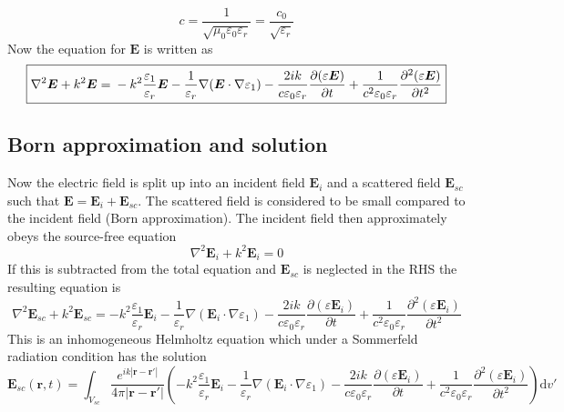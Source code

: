 \documentclass[10pt,a4paper]{eitExjobb}
\begin{document}
	\begin{equation*}
	c = \frac{1}{\sqrt{\mu_0 \varepsilon_0 \varepsilon_r}} = \frac{c_0}{\sqrt{\varepsilon_r}}
	\end{equation*}
	Now the equation for $\bm{E}$ is written as
	\begin{equation*}
	\boxed{
		\nabla^2\bm{E} + k^2 \bm{E} = \\
		-k^2 \frac{\varepsilon_1}{\varepsilon_r} \bm{E} -\frac{1}{\varepsilon_r}\nabla(\bm{E} \cdot \nabla \varepsilon_1) - \frac{2ik}{c\varepsilon_0\varepsilon_r} \frac{\partial (\varepsilon \bm{E})}{\partial t} + \frac{1}{c^2 \varepsilon_0 \varepsilon_r} \frac{\partial^2 (\varepsilon \bm{E})}{\partial t^2}
	}
	\end{equation*}
	
	\subsection{Born approximation and solution}
	Now the electric field is split up into an incident field $\bm{E}_i$ and a scattered field $\bm{E}_{sc}$ such that $\bm{E} = \bm{E}_i + \bm{E}_{sc}$. The scattered field is considered to be small compared to the incident field (Born approximation). The incident field then approximately obeys the source-free equation
	\begin{equation*}
	\nabla^2 \bm{E}_{i} + k^2 \bm{E}_{i} = 0
	\end{equation*}
	If this is subtracted from the total equation and $\bm{E}_{sc}$ is neglected in the RHS the resulting equation is
	\begin{equation*}
	\nabla^2\bm{E}_{sc} + k^2 \bm{E}_{sc} =	-k^2 \frac{\varepsilon_1}{\varepsilon_r} \bm{E}_i -\frac{1}{\varepsilon_r}\nabla(\bm{E}_i \cdot \nabla \varepsilon_1) - \frac{2ik}{c\varepsilon_0\varepsilon_r} \frac{\partial (\varepsilon \bm{E}_i)}{\partial t} + \frac{1}{c^2 \varepsilon_0 \varepsilon_r} \frac{\partial^2 (\varepsilon \bm{E}_i)}{\partial t^2}
	\end{equation*}
	This is an inhomogeneous Helmholtz equation which under a Sommerfeld radiation condition has the solution 
	\begin{equation*}
	\boxed{
		\bm{E}_{sc}(\bm{r},t) = \int_{V_{sc}} \frac{e^{ik |\bm{r}-\bm{r'}| }}{4\pi |\bm{r}-\bm{r'}|} \left( -k^2 \frac{\varepsilon_1}{\varepsilon_r} \bm{E}_i -\frac{1}{\varepsilon_r}\nabla(\bm{E}_i \cdot \nabla \varepsilon_1) - \frac{2ik}{c\varepsilon_0\varepsilon_r} \frac{\partial (\varepsilon \bm{E}_i)}{\partial t} + \frac{1}{c^2 \varepsilon_0 \varepsilon_r} \frac{\partial^2 (\varepsilon \bm{E}_i)}{\partial t^2} \right) \mathrm{d}v'
	}
	\end{equation*}
	
\end{document}
